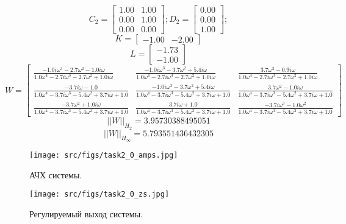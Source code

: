 \[C_2 = \begin{bmatrix}
    1.00 &  1.00\\
    0.00 &  1.00\\
    0.00 &  0.00
  \end{bmatrix}; D_2 = \begin{bmatrix}
    0.00\\
    0.00\\
    1.00
  \end{bmatrix};\]
  \[K = \begin{bmatrix}
   -1.00 & -2.00
  \end{bmatrix}\]
  \[L = \begin{bmatrix}
   -1.73\\
   -1.00
  \end{bmatrix}\]
  \[W = \left[\begin{matrix}\frac{- 1.0 i \omega^{3} - 2.7 \omega^{2} - 1.0 i \omega}{1.0 \omega^{4} - 2.7 i \omega^{3} - 2.7 \omega^{2} + 1.0 i \omega} & \frac{- 1.0 i \omega^{3} - 3.7 \omega^{2} + 5.4 i \omega}{1.0 \omega^{4} - 2.7 i \omega^{3} - 2.7 \omega^{2} + 1.0 i \omega} & \frac{3.7 \omega^{2} - 0.9 i \omega}{1.0 \omega^{4} - 2.7 i \omega^{3} - 2.7 \omega^{2} + 1.0 i \omega}\\\frac{- 3.7 i \omega - 1.0}{1.0 \omega^{4} - 3.7 i \omega^{3} - 5.4 \omega^{2} + 3.7 i \omega + 1.0} & \frac{- 1.0 i \omega^{3} - 3.7 \omega^{2} + 5.4 i \omega}{1.0 \omega^{4} - 3.7 i \omega^{3} - 5.4 \omega^{2} + 3.7 i \omega + 1.0} & \frac{3.7 \omega^{2} - 1.0 i \omega}{1.0 \omega^{4} - 3.7 i \omega^{3} - 5.4 \omega^{2} + 3.7 i \omega + 1.0}\\\frac{- 3.7 \omega^{2} + 1.0 i \omega}{1.0 \omega^{4} - 3.7 i \omega^{3} - 5.4 \omega^{2} + 3.7 i \omega + 1.0} & \frac{3.7 i \omega + 1.0}{1.0 \omega^{4} - 3.7 i \omega^{3} - 5.4 \omega^{2} + 3.7 i \omega + 1.0} & \frac{- 3.7 i \omega^{3} - 1.0 \omega^{2}}{1.0 \omega^{4} - 3.7 i \omega^{3} - 5.4 \omega^{2} + 3.7 i \omega + 1.0}\end{matrix}\right]\]
  \[||W||_{H_2} = 3.95730388495051\]
  \[||W||_{H_\infty} = 5.793551436432305 \]

  \begin{figure}[ht!]
    \centering
    \texttt{[image: src/figs/task2\_0\_amps.jpg]}
    \caption{АЧХ системы.}
    \label{fig:task2_0_amps}
  \end{figure}
  
  \begin{figure}[ht!]
    \centering
    \texttt{[image: src/figs/task2\_0\_zs.jpg]}
    \caption{Регулируемый выход системы.}
    \label{fig:task2_0_zs}
  \end{figure}
  
